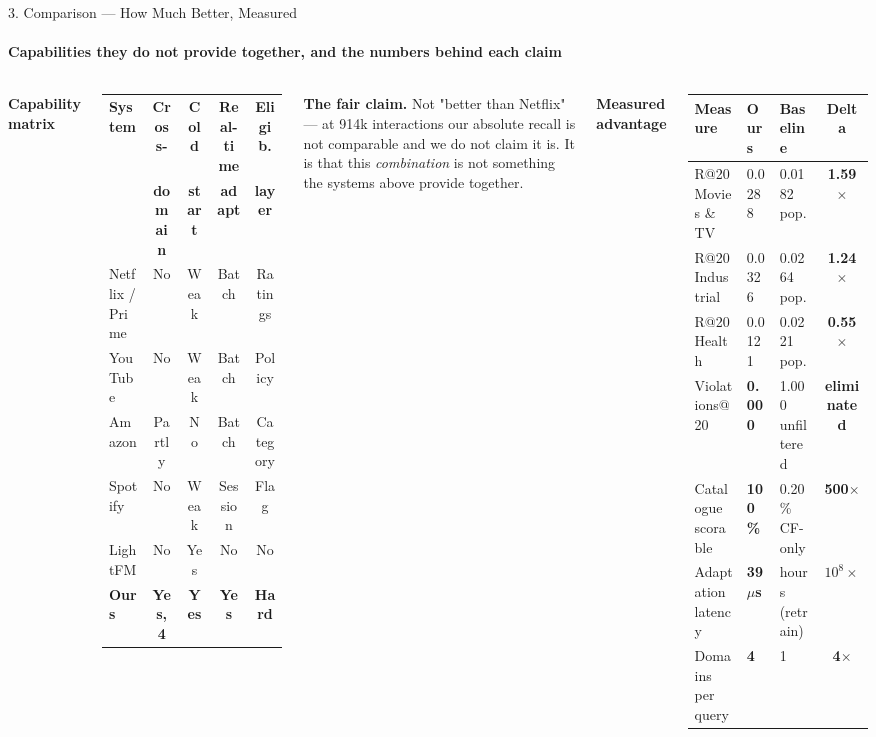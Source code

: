 \documentclass[aspectratio=169, 11pt]{beamer}
\newcommand{\eqs}{%
  \setlength{\abovedisplayskip}{3pt}%
  \setlength{\belowdisplayskip}{3pt}%
  \setlength{\abovedisplayshortskip}{2pt}%
  \setlength{\belowdisplayshortskip}{2pt}}
\newcommand{\blk}[1]{{\scriptsize\eqs\textbf{#1}}\par\vspace{0.9mm}}
\begin{document}
\begin{frame}[shrink]{3. Comparison --- How Much Better, Measured}
\framesubtitle{Capabilities they do not provide together, and the numbers behind each claim}
\vspace{1mm}
\begin{columns}[T]
\blk{Capability matrix}
{\tiny
\renewcommand{\arraystretch}{1.20}
\begin{tabular}{L{2.0cm} c c c c}
\toprule
\textbf{System} & \textbf{Cross-} & \textbf{Cold} & \textbf{Real-time} & \textbf{Eligib.}\\
                & \textbf{domain} & \textbf{start}& \textbf{adapt}    & \textbf{layer}\\
\midrule
Netflix / Prime & No     & Weak & Batch   & Ratings\\
YouTube         & No     & Weak & Batch   & Policy\\
Amazon          & Partly & No   & Batch   & Category\\
Spotify         & No     & Weak & Session & Flag\\
LightFM         & No     & Yes  & No      & No\\
\midrule
\textbf{Ours}   & \textbf{Yes, 4} & \textbf{Yes} & \textbf{Yes} & \textbf{Hard}\\
\bottomrule
\end{tabular}}
\vspace{2mm}

{\scriptsize\textbf{The fair claim.} Not "better than Netflix" --- at 914k interactions our absolute
recall is not comparable and we do not claim it is. It is that this \emph{combination} is not
something the systems above provide together.}

\blk{Measured advantage}
{\tiny
\renewcommand{\arraystretch}{1.26}
\begin{tabular}{L{2.4cm} L{1.5cm} L{1.5cm} c}
\toprule
\textbf{Measure} & \textbf{Ours} & \textbf{Baseline} & \textbf{Delta}\\
\midrule
R@20 Movies \& TV   & 0.0288 & 0.0182 pop. & \textbf{1.59$\times$}\\
R@20 Industrial     & 0.0326 & 0.0264 pop. & \textbf{1.24$\times$}\\
R@20 Health         & 0.0121 & 0.0221 pop. & \textcolor{amritaMaroon}{\textbf{0.55$\times$}}\\
\midrule
Violations@20       & \textbf{0.000} & 1.000 unfiltered & \textbf{eliminated}\\
Catalogue scorable  & \textbf{100\%} & 0.20\% CF-only & \textbf{500$\times$}\\
Adaptation latency  & \textbf{39\,$\mu$s} & hours (retrain) & \textbf{$10^{8}\times$}\\
Domains per query   & \textbf{4} & 1 & \textbf{4$\times$}\\
\bottomrule
\end{tabular}}
\vspace{1.5mm}


\end{columns}
\end{frame}
\end{document}
